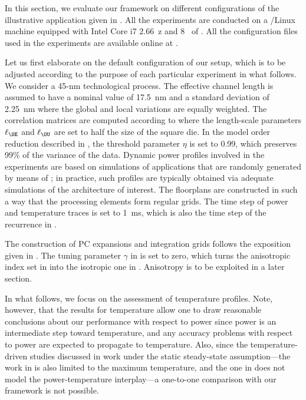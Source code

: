 In this section, we evaluate our framework on different configurations of the
illustrative application given in . All the
experiments are conducted on a /Linux machine equipped with Intel Core
i7 2.66~z and 8~ of . All the configuration files used in
the experiments are available online at \cite{eslab2014b}.

Let us first elaborate on the default configuration of our setup, which is to be
adjusted according to the purpose of each particular experiment in what follows.
We consider a 45-nm technological process. The effective channel length is
assumed to have a nominal value of 17.5~nm \cite{ptm} and a standard deviation
of 2.25~nm where the global and local variations are equally weighted. The
correlation matrices are computed according to  where
the length-scale parameters $\ell_\SE$ and $\ell_\OU$ are set to half the size
of the square die. In the model order reduction described in
, the threshold parameter $\eta$ is set to
0.99, which preserves 99\% of the variance of the data. Dynamic power profiles
involved in the experiments are based on simulations of applications that are
randomly generated by means of  \cite{dick1998}; in practice, such
profiles are typically obtained via adequate simulations of the architecture of
interest. The floorplans are constructed in such a way that the processing
elements form regular grids. The time step \dt of power and temperature traces
is set to 1~ms, which is also the time step of the recurrence in
.

The construction of \ac{PC} expansions and integration grids follows the
exposition given in . The tuning parameter $\gamma$ in
 is set to zero, which turns the anisotropic
index set in  into the isotropic one in
. Anisotropy is to be exploited in a later
section.

In what follows, we focus on the assessment of temperature profiles. Note,
however, that the results for temperature allow one to draw reasonable
conclusions about our performance with respect to power since power is an
intermediate step toward temperature, and any accuracy problems with respect to
power are expected to propagate to temperature. Also, since the
temperature-driven studies \cite{huang2009a, juan2011, juan2012, lee2013}
discussed in  work under the static steady-state
assumption---the work in \cite{juan2011} is also limited to the maximum
temperature, and the one in \cite{huang2009a} does not model the
power-temperature interplay---a one-to-one comparison with our framework is not
possible.

